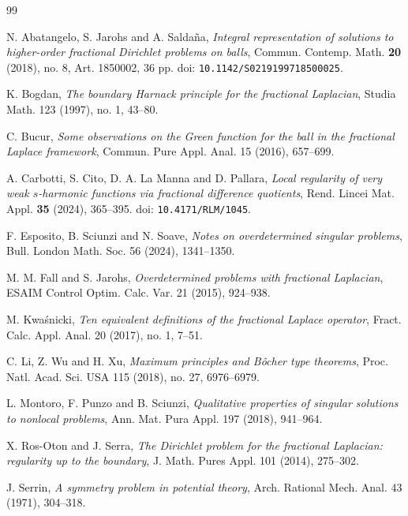 \documentclass[11pt,a4paper]{article}
\begin{document}
\begin{thebibliography}{99}

N. Abatangelo, S. Jarohs and A. Salda\~na,
\emph{Integral representation of solutions to higher-order fractional Dirichlet problems on balls},
Commun. Contemp. Math. \textbf{20} (2018), no. 8, Art. 1850002, 36 pp.
doi: \texttt{10.1142/S0219199718500025}.

K. Bogdan,
\emph{The boundary Harnack principle for the fractional Laplacian},
Studia Math. 123 (1997), no. 1, 43--80.

C. Bucur,
\emph{Some observations on the Green function for the ball in the fractional Laplace framework},
Commun. Pure Appl. Anal. 15 (2016), 657--699.

A. Carbotti, S. Cito, D. A. La Manna and D. Pallara,
\emph{Local regularity of very weak \(s\)-harmonic functions via fractional
difference quotients},
Rend. Lincei Mat. Appl. \textbf{35} (2024), 365--395.
doi: \texttt{10.4171/RLM/1045}.

F. Esposito, B. Sciunzi and N. Soave,
\emph{Notes on overdetermined singular problems},
Bull. London Math. Soc. 56 (2024), 1341--1350.

M. M. Fall and S. Jarohs,
\emph{Overdetermined problems with fractional Laplacian},
ESAIM Control Optim. Calc. Var. 21 (2015), 924--938.

M. Kwa\'snicki,
\emph{Ten equivalent definitions of the fractional Laplace operator},
Fract. Calc. Appl. Anal. 20 (2017), no. 1, 7--51.

C. Li, Z. Wu and H. Xu,
\emph{Maximum principles and B\^ocher type theorems},
Proc. Natl. Acad. Sci. USA 115 (2018), no. 27, 6976--6979.

L. Montoro, F. Punzo and B. Sciunzi,
\emph{Qualitative properties of singular solutions to nonlocal problems},
Ann. Mat. Pura Appl. 197 (2018), 941--964.

X. Ros-Oton and J. Serra,
\emph{The Dirichlet problem for the fractional Laplacian: regularity up to the boundary},
J. Math. Pures Appl. 101 (2014), 275--302.

J. Serrin,
\emph{A symmetry problem in potential theory},
Arch. Rational Mech. Anal. 43 (1971), 304--318.

\end{thebibliography}
\end{document}
